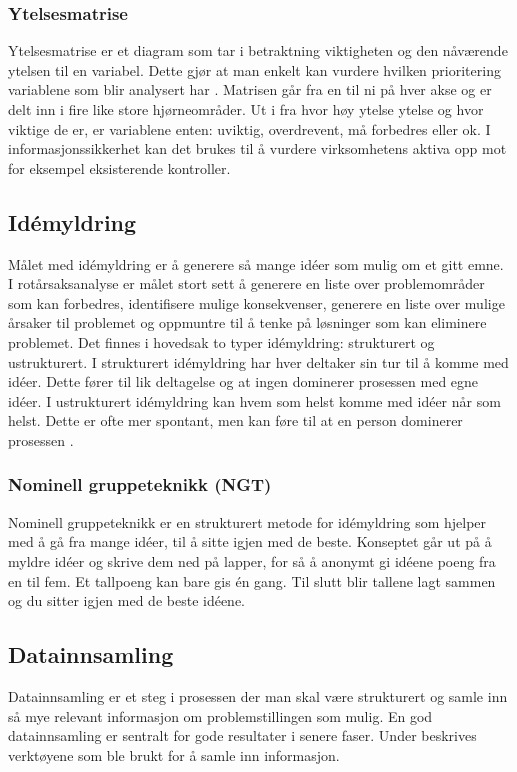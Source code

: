 \subsubsection{Ytelsesmatrise}
Ytelsesmatrise er et diagram som tar i betraktning viktigheten og den nåværende ytelsen til en variabel. Dette gjør at man enkelt kan vurdere hvilken prioritering variablene som blir analysert har \cite{RCA}. Matrisen går fra en til ni på hver akse og er delt inn i fire like store hjørneområder. Ut i fra hvor høy ytelse ytelse og hvor viktige de er, er variablene enten: uviktig, overdrevent, må forbedres eller ok. I informasjonssikkerhet kan det brukes til å vurdere virksomhetens aktiva opp mot for eksempel eksisterende kontroller.

\subsection{Idémyldring}
Målet med idémyldring er å generere så mange idéer som mulig om et gitt emne. I rotårsaksanalyse er målet stort sett å generere en liste over problemområder som kan forbedres, identifisere mulige konsekvenser, generere en liste over mulige årsaker til problemet og oppmuntre til å tenke på løsninger som kan eliminere problemet. Det finnes i hovedsak to typer idémyldring: strukturert og ustrukturert. I strukturert idémyldring har hver deltaker sin tur til å komme med idéer. Dette fører til lik deltagelse og at ingen dominerer prosessen med egne idéer. I ustrukturert idémyldring kan hvem som helst komme med idéer når som helst. Dette er ofte mer spontant, men kan føre til at en person dominerer prosessen \cite{RCA}. 

\subsubsection{Nominell gruppeteknikk (NGT)}
Nominell gruppeteknikk er en strukturert metode for idémyldring som hjelper med å gå fra mange idéer, til å sitte igjen med de beste. Konseptet går ut på å myldre idéer og skrive dem ned på lapper, for så å anonymt gi idéene poeng fra en til fem. Et tallpoeng kan bare gis én gang. Til slutt blir tallene lagt sammen og du sitter igjen med de beste idéene. 

\subsection{Datainnsamling}
Datainnsamling er et steg i prosessen der man skal være strukturert og samle inn så mye relevant informasjon om problemstillingen som mulig. En god datainnsamling er sentralt for gode resultater i senere faser. Under beskrives verktøyene som ble brukt for å samle inn informasjon. 

